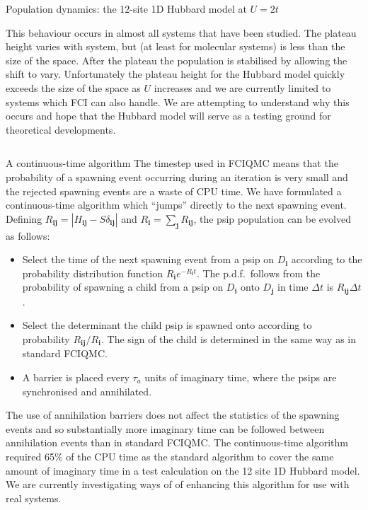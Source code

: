 \documentclass[final]{beamer} %
\newcommand{\abs}[1]{\left\vert#1\right\vert}
\newcommand{\bi}{\mathbf{i}}
\newcommand{\bj}{\mathbf{j}}
\begin{document}
\begin{frame}[t]
\begin{columns}[t]
\begin{column}{0.9\paperwidth}
\begin{block}{Population dynamics: the 12-site 1D Hubbard model at $U=2t$}
\begin{multicols}{4}
         This behaviour occurs in almost all systems that have been studied.  The plateau height varies with system, but (at least for molecular systems) is less than the size of the space.  After the plateau the population is stabilised by allowing the shift to vary.  Unfortunately the plateau height for the Hubbard model quickly exceeds the size of the space as $U$ increases and we are currently limited to systems which FCI can also handle.  We are attempting to understand why this occurs and hope that the Hubbard model will serve as a testing ground for theoretical developments.
       \end{multicols}
   \end{block}
% 
   \begin{columns}[t]
%
       \begin{column}{0.33\paperwidth}
           \begin{block}{A continuous-time algorithm}
           The timestep used in FCIQMC means that the probability of a spawning event occurring during an iteration is very small and the rejected spawning events are a waste of CPU time.  We have formulated a continuous-time algorithm which ``jumps'' directly to the next spawning event.  Defining $R_{\bi\bj} = \abs{H_{\bi\bj}-S\delta_{\bi\bj}}$ and $R_\bi = \sum_\bj R_{\bi\bj}$, the psip population can be evolved as follows:
           \begin{itemize}
           \item Select the time of the next spawning event from a psip on $D_\bi$ according to the probability distribution function $R_\bi e^{-R_\bi t}$.  The p.d.f.~follows from the probability of spawning a child from a psip on $D_\bi$ onto $D_\bj$ in time $\Delta t$ is $R_{\bi\bj}\Delta t$.
           \item Select the determinant the child psip is spawned onto according to probability $R_{\bi\bj}/R_\bi$.  The sign of the child is determined in the same way as in standard FCIQMC.
           \item A barrier is placed every $\tau_a$ units of imaginary time, where the psips are synchronised and annihilated.
           \end{itemize}
           The use of annihilation barriers does not affect the statistics of the spawning events and so substantially more imaginary time can be followed between annihilation events than in standard FCIQMC.  The continuous-time algorithm required 65\% of the CPU time as the standard algorithm to cover the same amount of imaginary time in a test calculation on the 12 site 1D Hubbard model.  We are currently investigating ways of of enhancing this algorithm for use with real systems.

\end{block}
\end{column}
\end{columns}
\end{column}
\end{columns}
\end{frame}
\end{document}
